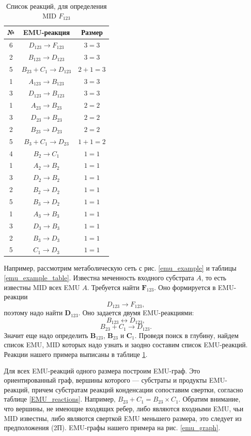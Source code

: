 \documentclass[14pt, a4paper]{extreport}
\begin{document}
\clearpage
\begin{table}
	\begin{tabular}{c c c}
		\hline
		№ & EMU-реакция & Размер\\
		\hline
		6 & $D_{123} \to F_{123}$ & $3 = 3$\\
		2 & $B_{123} \to D_{123}$ & $3 = 3$\\
		5 & $B_{23} + C_1 \to D_{123}$ & $2 + 1 = 3$\\
		1 & $A_{123} \to B_{123}$ & $3 = 3$\\
		3 & $D_{123} \to B_{123}$ & $3 = 3$\\
		1 & $A_{23} \to B_{23}$ & $2 = 2$\\
		3 & $D_{23} \to B_{23}$ & $2 = 2$\\
		2 & $B_{23} \to D_{23}$ & $2 = 2$\\
		5 & $B_3 + C_1 \to D_{23}$ & $1 + 1 = 2$\\
		4 & $B_2 \to C_1$ & $1 = 1$\\
		1 & $A_2 \to B_2$ & $1 = 1$\\
		3 & $D_2 \to B_2$ & $1 = 1$\\
		2 & $B_2 \to D_2$ & $1 = 1$\\
		5 & $B_3 \to D_2$ & $1 = 1$\\
		1 & $A_3 \to B_3$ & $1 = 1$\\
		3 & $D_3 \to B_3$ & $1 = 1$\\
		2 & $B_3 \to D_3$ & $1 = 1$\\
		5 & $C_1 \to D_3$ & $1 = 1$\\
	\end{tabular}
	\caption{Список реакций, для определения MID $F_{123}$}
	\label{all_emu_reactions}
\end{table}


Например, рассмотрим метаболическую сеть с рис. \ref{emu_example} и таблицы \ref{emu_example_table}. Известна меченность входного субстрата $A$, то есть известны MID всех EMU $A$. Требуется найти $\mathbf{F}_{123}$. Оно формируется в EMU-реакции $$D_{123} \to F_{123},$$ поэтому надо найти $\mathbf{D}_{123}$. Оно задается двумя EMU-реакциями: $$B_{123} \leftrightarrow D_{123},$$ $$B_{23} + C_1 \to D_{123}.$$ Значит еще надо определить $\mathbf{B}_{123}$, $\mathbf{B}_{23}$ и $\mathbf{C}_1$. Проведя поиск в глубину, найдем список EMU, MID которых надо узнать и заодно составим список EMU-реакций. Реакции нашего примера выписаны в таблице \ref{all_emu_reactions}.

Для всех EMU-реакций одного размера построим EMU-граф. Это ориентированный граф, вершины которого --- субстраты и продукты EMU-реакций, причем субстратам реакций конденсации сопоставим свертки, согласно таблице \ref{EMU_reactions}. Например, $B_{23} + C_1 = B_{23} \times C_1$. Обратим внимание, что вершины, не имеющие входящих ребер, либо являются входными EMU, чьи MID известны, либо являются сверткой EMU меньшего размера, это следует из предположения (2П). EMU-графы нашего примера на рис. \ref{emu_graph}.
\end{document}
